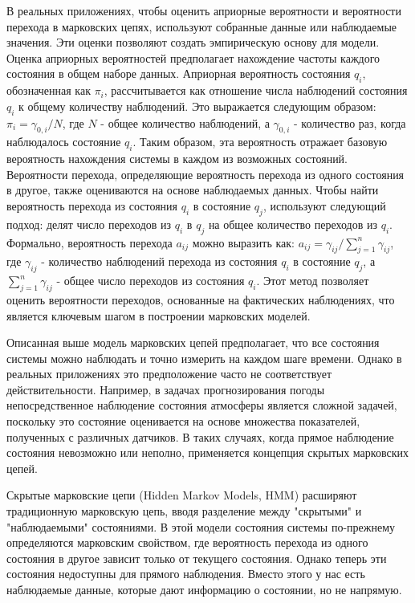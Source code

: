 В реальных приложениях, чтобы оценить априорные вероятности и вероятности перехода в марковских цепях, используют собранные данные или наблюдаемые значения. Эти оценки позволяют создать эмпирическую основу для модели. Оценка априорных вероятностей предполагает нахождение частоты каждого состояния в общем наборе данных. Априорная вероятность состояния $q_i$, обозначенная как $\pi_i$, рассчитывается как отношение числа наблюдений состояния $q_i$ к общему количеству наблюдений. Это выражается следующим образом: $\pi_i = \gamma_{0, i} / N$, где $N$ - общее количество наблюдений, а $\gamma_{0, i}$ - количество раз, когда наблюдалось состояние $q_i$. Таким образом, эта вероятность отражает базовую вероятность нахождения системы в каждом из возможных состояний. Вероятности перехода, определяющие вероятность перехода из одного состояния в другое, также оцениваются на основе наблюдаемых данных. Чтобы найти вероятность перехода из состояния $q_i$ в состояние $q_j$, используют следующий подход: делят число переходов из $q_i$ в $q_j$ на общее количество переходов из $q_i$. Формально, вероятность перехода $a_{ij}$ можно выразить как: $a_{ij} = \gamma_{ij} / \sum\limits_{j = 1}^n \gamma_{ij}$, где $\gamma_{ij}$ - количество наблюдений перехода из состояния $q_i$ в состояние $q_j$, а $\sum_{j = 1}^n \gamma_{ij}$ - общее число переходов из состояния $q_i$. Этот метод позволяет оценить вероятности переходов, основанные на фактических наблюдениях, что является ключевым шагом в построении марковских моделей.

Описанная выше модель марковских цепей предполагает, что все состояния системы можно наблюдать и точно измерить на каждом шаге времени. Однако в реальных приложениях это предположение часто не соответствует действительности. Например, в задачах прогнозирования погоды непосредственное наблюдение состояния атмосферы является сложной задачей, поскольку это состояние оценивается на основе множества показателей, полученных с различных датчиков. В таких случаях, когда прямое наблюдение состояния невозможно или неполно, применяется концепция скрытых марковских цепей.

Скрытые марковские цепи (Hidden Markov Models, HMM) расширяют традиционную марковскую цепь, вводя разделение между "скрытыми" и "наблюдаемыми" состояниями. В этой модели состояния системы по-прежнему определяются марковским свойством, где вероятность перехода из одного состояния в другое зависит только от текущего состояния. Однако теперь эти состояния недоступны для прямого наблюдения. Вместо этого у нас есть наблюдаемые данные, которые дают информацию о состоянии, но не напрямую.

